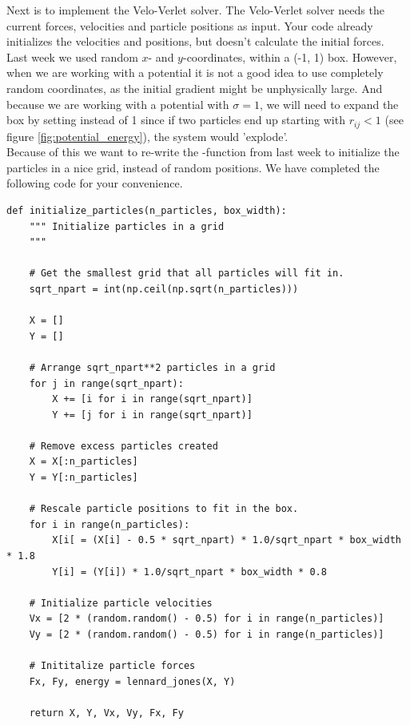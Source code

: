 \documentclass{article}
\begin{document}
Next is to implement the Velo-Verlet solver.
The Velo-Verlet solver needs the current forces, velocities and particle positions as input.
Your code already initializes the velocities and positions, but doesn't calculate the initial forces.\\

Last week we used random $x$- and $y$-coordinates, within a (-1, 1) box.
However, when we are working with a potential it is not a good idea to use completely random coordinates, as the initial gradient might be unphysically large.
And because we are working with a potential with $\sigma = 1$, we will need to expand the box by setting  instead of 1 since if two particles end up starting with $r_{ij} < 1$ (see figure \ref{fig:potential_energy}), the system would 'explode'.\\

Because of this we want to re-write the -function from last week to initialize the particles in a nice grid, instead of random positions.
We have completed the following code for your convenience.

\begin{lstlisting}
def initialize_particles(n_particles, box_width):
    """ Initialize particles in a grid
    """
    
    # Get the smallest grid that all particles will fit in.
    sqrt_npart = int(np.ceil(np.sqrt(n_particles)))

    X = []
    Y = []

    # Arrange sqrt_npart**2 particles in a grid
    for j in range(sqrt_npart):
        X += [i for i in range(sqrt_npart)]
        Y += [j for i in range(sqrt_npart)]

    # Remove excess particles created
    X = X[:n_particles]
    Y = Y[:n_particles]

    # Rescale particle positions to fit in the box.
    for i in range(n_particles):
        X[i[ = (X[i] - 0.5 * sqrt_npart) * 1.0/sqrt_npart * box_width * 1.8
        Y[i] = (Y[i]) * 1.0/sqrt_npart * box_width * 0.8

    # Initialize particle velocities
    Vx = [2 * (random.random() - 0.5) for i in range(n_particles)]
    Vy = [2 * (random.random() - 0.5) for i in range(n_particles)]

    # Inititalize particle forces
    Fx, Fy, energy = lennard_jones(X, Y)

    return X, Y, Vx, Vy, Fx, Fy

\end{lstlisting}
\end{document}
